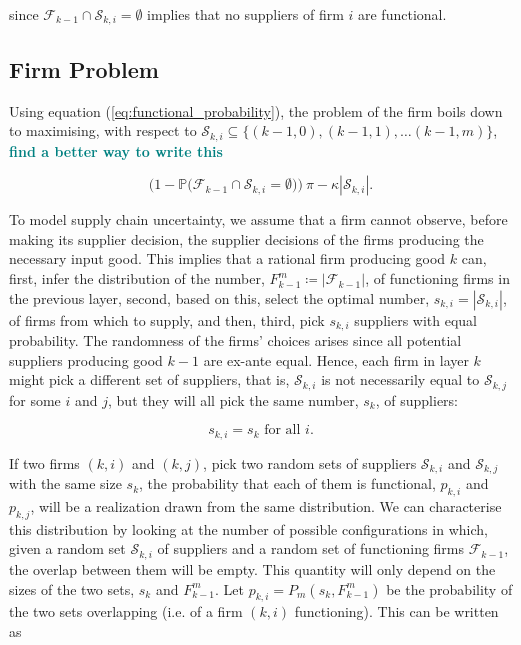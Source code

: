 \documentclass[american, abstract=on]{scrartcl}
\theoremstyle{plain}
\renewcommand{\P}{\mathbb{P}}
\newcommand{\abs}[1]{\left\lvert#1\right\rvert}
\newcommand\notes[1]{\textcolor{teal}{\footnotesize \textbf{#1}}}
\begin{document}
since $\mathcal{F}_{k - 1} \cap \mathcal{S}_{k, i} = \emptyset$ implies that no suppliers of firm $i$ are functional.

\subsection{Firm Problem}

Using equation (\ref{eq:functional_probability}), the problem of the firm boils down to maximising, with respect to $\mathcal{S}_{k, i} \subseteq \{(k-1, 0), (k-1, 1), \ldots (k-1, m)\}$, \notes{find a better way to write this}

\begin{equation}
  \Big(1 - \P\big( \mathcal{F}_{k - 1} \cap \mathcal{S}_{k, i} = \emptyset \big) \Big) \ \pi  - \kappa \abs{\mathcal{S}_{k, i} }.
\end{equation}


To model supply chain uncertainty, we assume that a firm cannot observe, before making its supplier decision, the supplier decisions of the firms producing the necessary input good. This implies that a rational firm producing good $k$ can, first, infer the distribution of the number, $F^{m}_{k - 1} \coloneqq \abs{\mathcal{F}_{k - 1}}$, of functioning firms in the previous layer, second, based on this, select the optimal number, $s_{k, i} = \abs{\mathcal{S}_{k, i}}$, of firms from which to supply, and then, third, pick $s_{k, i}$ suppliers with equal probability. The randomness of the firms' choices arises since all potential suppliers producing good $k - 1$ are ex-ante equal. Hence, each firm in layer $k$ might pick a different set of suppliers, that is, $\mathcal{S}_{k, i}$ is not necessarily equal to $\mathcal{S}_{k, j}$ for some $i$ and $j$, but they will all pick the same number, $s_k$, of suppliers:

\begin{equation}
  s_{k, i} = s_k \text{ for all } i.
\end{equation}

If two firms $(k, i)$ and $(k, j)$, pick two random sets of suppliers $\mathcal{S}_{k, i}$ and $\mathcal{S}_{k, j}$ with the same size $s_k$, the probability that each of them is functional, $p_{k, i}$ and $p_{k, j}$, will be a realization drawn from the same distribution. We can characterise this distribution by looking at the number of possible configurations in which, given a random set $\mathcal{S}_{k, i}$ of suppliers and a random set of functioning firms $\mathcal{F}_{k - 1}$, the overlap between them will be empty. This quantity will only depend on the sizes of the two sets, $s_k$ and $F^m_{k-1}$. Let $p_{k, i} = P_m(s_k, F^m_{k - 1})$ be the probability of the two sets overlapping (i.e. of a firm $(k, i)$ functioning). This can be written as 
\end{document}
